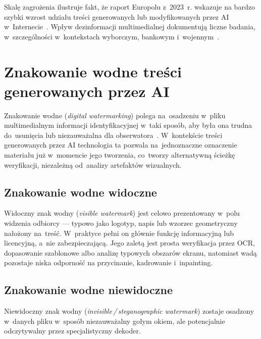 Skal\k{e} zagro\.{z}enia ilustruje fakt, \.{z}e raport Europolu z~2023~r.
wskazuje na bardzo szybki wzrost udziału treści generowanych lub modyfikowanych
przez AI w~Internecie~\cite{Europol2023Deepfakes}.
Wp\l{}yw dezinformacji multimedialnej dokumentuj\k{a} liczne
badania, w~szczeg\'{o}lno\'{s}ci w~kontekstach wyborczym,
bankowym i~wojennym~\cite{Khan2025ComprehensiveSurvey}.

\section{Znakowanie wodne tre\'{s}ci generowanych przez AI}
\label{sec:watermarking_detail}

Znakowanie wodne (\textit{digital watermarking}) polega na~osadzeniu
w~pliku multimedialnym informacji identyfikacyjnej w~taki spos\'{o}b,
aby by\l{}a ona trudna do~usuni\k{e}cia lub niezauwa\.{z}alna
dla obserwatora~\cite{Luo2025WatermarkingAIGC}.
W~kontek\'{s}cie tre\'{s}ci generowanych przez AI technologia ta
pozwala na~jednoznaczne oznaczenie materia\l{}u ju\.{z} w~momencie
jego tworzenia, co~tworzy alternatywn\k{a} \'{s}cie\.{z}k\k{e}
weryfikacji, niezale\.{z}n\k{a} od~analizy artefakt\'{o}w wizualnych.

\subsection{Znakowanie wodne widoczne}
\label{sec:watermark_visible}

Widoczny znak wodny (\textit{visible watermark}) jest celowo
prezentowany w~polu widzenia odbiorcy --- typowo jako logotyp,
napis lub wzorzec geometryczny na\l{}o\.{z}ony na~tre\'{s}\'{c}.
W~praktyce pe\l{}ni on g\l{}\'{o}wnie funkcj\k{e} informacyjn\k{a}
lub licencyjn\k{a}, a~nie zabezpieczaj\k{a}c\k{a}. Jego zalet\k{a}
jest prosta weryfikacja przez OCR, dopasowanie szablonowe albo analiz\k{e}
typowych obszar\'{o}w ekranu, natomiast wad\k{a} pozostaje niska odporno\'{s}\'{c}
na przycinanie, kadrowanie i~inpainting.

\subsection{Znakowanie wodne niewidoczne}
\label{sec:watermark_invisible}

Niewidoczny znak wodny (\textit{invisible\,/\,steganographic watermark})
zostaje osadzony w~danych pliku w~spos\'{o}b niezauwa\.{z}alny
go\l{}ym okiem, ale potencjalnie odczytywalny przez specjalistyczny
dekoder.


